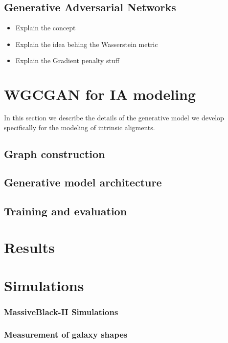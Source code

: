 \documentclass[a4paper,fleqn,usenatbib]{mnras}
\begin{document}
\subsection{Generative Adversarial Networks}

\begin{itemize}
	\item Explain the concept
	\item Explain the idea behing the Wasserstein metric
	\item Explain  the  Gradient penalty stuff
\end{itemize}

\section{WGCGAN for IA modeling}

In this section we describe the details of the generative model we develop specifically for the modeling of 
intrinsic aligments.

\subsection{Graph construction}


\subsection{Generative model architecture}

\subsection{Training and evaluation}

\section{Results}

\section{Simulations}

	\subsubsection{MassiveBlack-II Simulations}

	\subsubsection{Measurement of galaxy  shapes}
\end{document}
